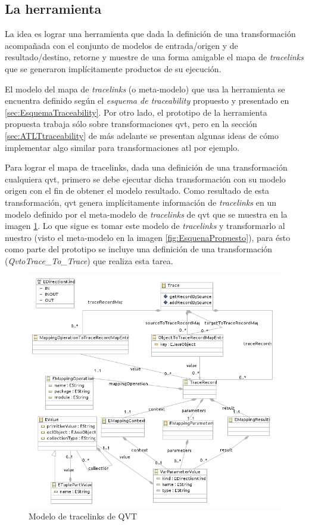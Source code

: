 \documentclass[a4paper,12pt,oneside,spanish]{book}
\begin{document}
\subsection{La herramienta}

La idea es lograr una herramienta que dada la definición de una transformación acompañada con el conjunto de modelos de entrada/origen y de resultado/destino, retorne y muestre de una forma amigable el mapa de \textit{tracelinks} que se generaron implícitamente productos de su ejecución. 

El modelo del mapa de \textit{tracelinks} (o meta-modelo) que usa la herramienta se encuentra definido según el \textit{esquema de traceability} propuesto y presentado en \ref{sec:EsquemaTraceability}. Por otro lado, el prototipo de la herramienta propuesta trabaja sólo sobre transformaciones \gls{qvt}, pero en la sección \ref{sec:ATLTtraceability} de más adelante se presentan algunas ideas de cómo implementar algo similar para transformaciones \gls{atl} por ejemplo.

Para lograr el mapa de tracelinks, dada una definición de una transformación cualquiera \gls{qvt}, primero se debe ejecutar dicha transformación con su modelo origen con el fin de obtener el modelo resultado. Como resultado de esta transformación, \gls{qvt} genera implícitamente información de \textit{tracelinks} en un modelo definido por el meta-modelo de \textit{tracelinks} de \gls{qvt} que se muestra en la imagen \ref{fig:QVTTraceModel}. Lo que sigue es tomar este modelo de \textit{tracelinks} y transformarlo al nuestro (visto el meta-modelo en la imagen \ref{fig:EsquenaPropuesto}), para ésto como parte del prototipo se incluye una definición de una transformación (\textsf{\textit{QvtoTrace\_To\_Trace}}) que realiza esta tarea.


\begin{figure}[hbtp]
\centering
\includegraphics[scale=0.75]{./img/QVTTraceModel}
\caption{Modelo de tracelinks de QVT}
\label{fig:QVTTraceModel}
\end{figure}
\end{document}
